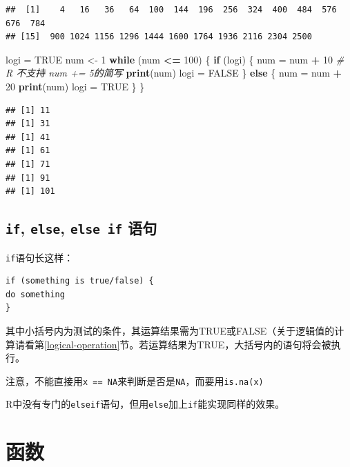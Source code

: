 \documentclass[]{book}
\newenvironment{Shaded}{\begin{snugshade}}{\end{snugshade}}
\newcommand{\CommentTok}[1]{\textcolor[rgb]{0.56,0.35,0.01}{\textit{#1}}}
\newcommand{\ControlFlowTok}[1]{\textcolor[rgb]{0.13,0.29,0.53}{\textbf{#1}}}
\newcommand{\DecValTok}[1]{\textcolor[rgb]{0.00,0.00,0.81}{#1}}
\newcommand{\KeywordTok}[1]{\textcolor[rgb]{0.13,0.29,0.53}{\textbf{#1}}}
\newcommand{\NormalTok}[1]{#1}
\newcommand{\OperatorTok}[1]{\textcolor[rgb]{0.81,0.36,0.00}{\textbf{#1}}}
\newcommand{\OtherTok}[1]{\textcolor[rgb]{0.56,0.35,0.01}{#1}}
\newcommand{\StringTok}[1]{\textcolor[rgb]{0.31,0.60,0.02}{#1}}
\begin{document}
\begin{verbatim}
##  [1]    4   16   36   64  100  144  196  256  324  400  484  576  676  784
## [15]  900 1024 1156 1296 1444 1600 1764 1936 2116 2304 2500
\end{verbatim}

\begin{Shaded}
\begin{Highlighting}[]
\NormalTok{logi =}\StringTok{ }\OtherTok{TRUE}
\NormalTok{num <-}\StringTok{ }\DecValTok{1}
\ControlFlowTok{while}\NormalTok{ (num }\OperatorTok{<=}\StringTok{ }\DecValTok{100}\NormalTok{) \{}
  \ControlFlowTok{if}\NormalTok{ (logi) \{}
\NormalTok{    num =}\StringTok{ }\NormalTok{num }\OperatorTok{+}\StringTok{ }\DecValTok{10} \CommentTok{# R 不支持 num += 5的简写}
    \KeywordTok{print}\NormalTok{(num)}
\NormalTok{    logi =}\StringTok{ }\OtherTok{FALSE}
\NormalTok{  \} }\ControlFlowTok{else}\NormalTok{ \{}
\NormalTok{    num =}\StringTok{ }\NormalTok{num }\OperatorTok{+}\StringTok{ }\DecValTok{20}
    \KeywordTok{print}\NormalTok{(num)}
\NormalTok{    logi =}\StringTok{ }\OtherTok{TRUE}
\NormalTok{  \}}
\NormalTok{\}}
\end{Highlighting}
\end{Shaded}

\begin{verbatim}
## [1] 11
## [1] 31
## [1] 41
## [1] 61
## [1] 71
## [1] 91
## [1] 101
\end{verbatim}

\hypertarget{if-else-else-if-}{%
\subsection{\texorpdfstring{\texttt{if}, \texttt{else}, \texttt{else\ if} 语句}{if, else, else if 语句}}\label{if-else-else-if-}}

\texttt{if}语句长这样：

\begin{verbatim}
if (something is true/false) {
do something
}
\end{verbatim}

其中小括号内为测试的条件，其运算结果需为TRUE或FALSE（关于逻辑值的计算请看第\ref{logical-operation}节。若运算结果为TRUE，大括号内的语句将会被执行。

注意，不能直接用\texttt{x\ ==\ NA}来判断是否是\texttt{NA}，而要用\texttt{is.na(x)}

R中没有专门的\texttt{elseif}语句，但用\texttt{else}加上\texttt{if}能实现同样的效果。

\section{函数}
\end{document}
